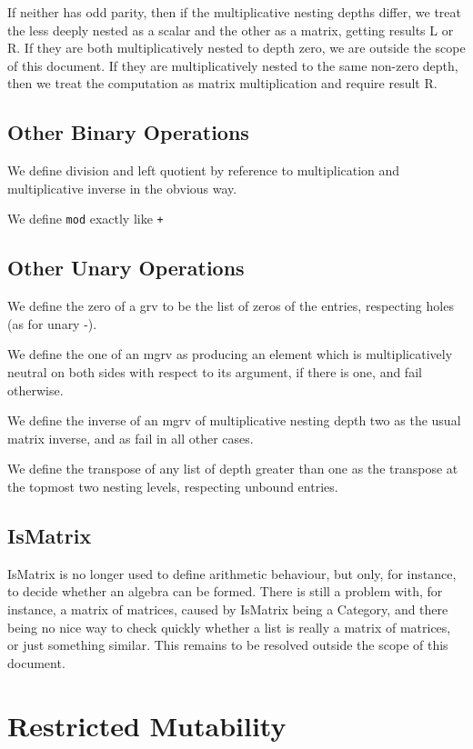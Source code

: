 \documentclass{article}
\begin{document}
If neither has odd parity, then if the multiplicative nesting depths
differ, we treat the less deeply nested as a scalar and the other as a
matrix, getting results L or R. If they are both multiplicatively
nested to depth zero, we are outside the scope of this document. If
they are multiplicatively nested to the same non-zero depth, then we
treat the computation as matrix multiplication and require result R.

\subsection{Other Binary Operations}

We define division and left quotient by reference to multiplication
and multiplicative inverse in the obvious way.

We define \verb|mod| exactly like \verb|+|

\subsection{Other Unary Operations}

We define the zero of a grv to be the list of zeros of the entries,
respecting holes (as for unary -).

We define the one of an mgrv as producing an element which is
multiplicatively neutral on both sides with respect to its argument,
if there is one, and fail otherwise.  

We define the inverse of an mgrv of multiplicative nesting depth two as the usual
matrix inverse, and as fail in all other cases.

We define the transpose of any list of depth greater than one as the
transpose at the topmost two nesting levels, respecting unbound
entries. 

\subsection{IsMatrix}

IsMatrix is no longer used to define arithmetic behaviour, but only,
for instance, to decide whether an algebra can be formed. There is
still a problem with, for instance, a matrix of matrices, caused by
IsMatrix being a Category, and there being no nice way to check
quickly whether a list is really a matrix of matrices, or just
something similar. This remains to be resolved outside the scope of
this document.

\section{Restricted Mutability}
\end{document}
